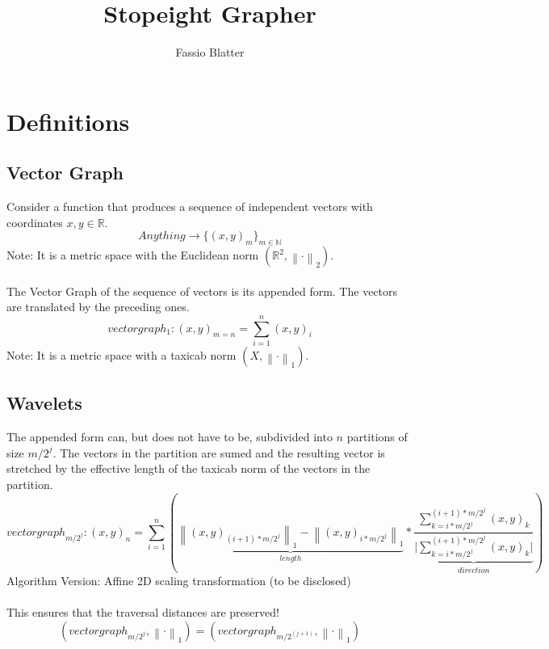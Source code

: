 \documentclass{report}
\newcommand\norm[1]{\left\lVert#1\right\rVert}
\begin{document}
\title{Stopeight Grapher}
\author{Fassio Blatter}
\maketitle

\chapter{Definitions}
\section{Vector Graph}
Consider a function that produces a sequence of independent vectors with coordinates $x,y \in \mathbb{R}$.
\begin{equation}
Anything \rightarrow \{(x,y)_{m}\}_{m \in \mathbb{N}}
\end{equation}
Note: It is a metric space with the Euclidean norm $(\mathbb{R}^2,\norm{\cdot}_2)$.\\\\
The Vector Graph of the sequence of vectors is its appended form. The vectors are translated by the preceding ones.\\
\begin{equation}
vectorgraph_{1}: (x,y)_{m=n}=\sum_{i=1}^{n} (x,y)_{i}
\end{equation}
Note: It is a metric space with a taxicab norm $(X,\norm{\cdot}_1)$.
\section{Wavelets}
The appended form can, but does not have to be, subdivided into $n$ partitions of size $m/2^j$. The vectors in the partition are sumed and the resulting vector is stretched by the effective length of the taxicab norm of the vectors in the partition.
\begin{equation}
vectorgraph_{m/2^j}:(x,y)_{n}=\sum_{i=1}^{n} (\underbrace{\norm{(x,y)_{(i+1)*m/2^j}}_{1} - \norm{(x,y)_{i*m/2^j}}_{1}}_{length} * \underbrace{\frac{\sum_{k=i*m/2^j}^{(i+1)*m/2^j} (x,y)_{k}}{\vert \sum_{k=i*m/2^j}^{(i+1)*m/2^j} (x,y)_{k} \vert}}_{direction})
\end{equation}
Algorithm Version: Affine 2D scaling transformation (to be disclosed)\\\\
This ensures that the traversal distances are preserved!
\begin{equation}
(vectorgraph_{m/2^j},\norm{\cdot}_{1})=(vectorgraph_{m/2^(j+1)},\norm{\cdot}_{1})
\end{equation}
\end{document}
